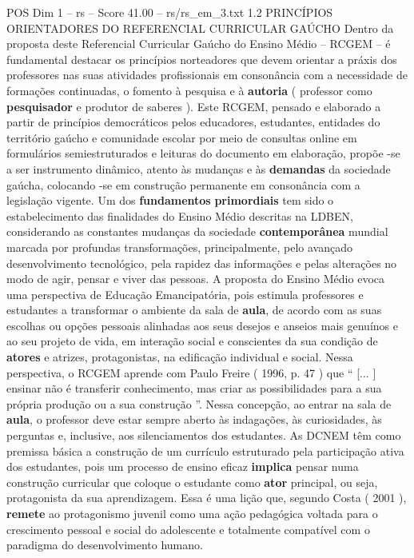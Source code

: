 \begin{textsample}{POS Dim 1 – rs – Score 41.00 – rs/rs\_em\_3.txt}  \label{ex:f1_pos_209}
1.2 PRINCÍPIOS ORIENTADORES DO REFERENCIAL CURRICULAR GAÚCHO Dentro da proposta deste Referencial Curricular Gaúcho do Ensino Médio – RCGEM – é fundamental destacar os princípios norteadores que devem orientar a práxis dos professores nas suas atividades profissionais em consonância com a necessidade de formações continuadas, o fomento à pesquisa e à \textbf{autoria} ( professor como \textbf{pesquisador} e produtor de saberes ).
Este RCGEM, pensado e elaborado a partir de princípios democráticos pelos educadores, estudantes, entidades do território gaúcho e comunidade escolar por meio de consultas online em formulários semiestruturados e leituras do documento em elaboração, propõe -se a ser instrumento dinâmico, atento às mudanças e às \textbf{demandas} da sociedade gaúcha, colocando -se em construção permanente em consonância com a legislação vigente.
Um dos \textbf{fundamentos} \textbf{primordiais} tem sido o estabelecimento das finalidades do Ensino Médio descritas na LDBEN, considerando as constantes mudanças da sociedade \textbf{contemporânea} mundial marcada por profundas transformações, principalmente, pelo avançado desenvolvimento tecnológico, pela rapidez das informações e pelas alterações no modo de agir, pensar e viver das pessoas.
A proposta do Ensino Médio evoca uma perspectiva de Educação Emancipatória, pois estimula professores e estudantes a transformar o ambiente da sala de \textbf{aula}, de acordo com as suas escolhas ou opções pessoais alinhadas aos seus desejos e anseios mais genuínos e ao seu projeto de vida, em interação social e conscientes da sua condição de \textbf{atores} e atrizes, protagonistas, na edificação individual e social.
Nessa perspectiva, o RCGEM aprende com Paulo Freire ( 1996, p. 47 ) que “ [... ] ensinar não é transferir conhecimento, mas criar as possibilidades para a sua própria produção ou a sua construção ”.
Nessa concepção, ao entrar na sala de \textbf{aula}, o professor deve estar sempre aberto às indagações, às curiosidades, às perguntas e, inclusive, aos silenciamentos dos estudantes.
As DCNEM têm como premissa básica a construção de um currículo estruturado pela participação ativa dos estudantes, pois um processo de ensino eficaz \textbf{implica} pensar numa construção curricular que coloque o estudante como \textbf{ator} principal, ou seja, protagonista da sua aprendizagem.
Essa é uma lição que, segundo Costa ( 2001 ), \textbf{remete} ao protagonismo juvenil como uma ação pedagógica voltada para o crescimento pessoal e social do adolescente e totalmente compatível com o paradigma do desenvolvimento humano.

\end{textsample}
